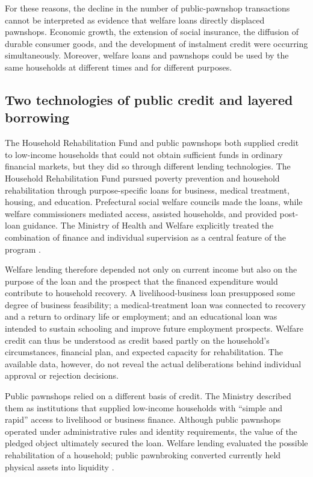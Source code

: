 \documentclass[12pt,a4paper]{article}
\begin{document}
For these reasons, the decline in the number of public-pawnshop transactions cannot be interpreted as evidence that welfare loans directly displaced pawnshops. Economic growth, the extension of social insurance, the diffusion of durable consumer goods, and the development of instalment credit were occurring simultaneously. Moreover, welfare loans and pawnshops could be used by the same households at different times and for different purposes.

\subsection{Two technologies of public credit and layered borrowing}

The Household Rehabilitation Fund and public pawnshops both supplied credit to low-income households that could not obtain sufficient funds in ordinary financial markets, but they did so through different lending technologies. The Household Rehabilitation Fund pursued poverty prevention and household rehabilitation through purpose-specific loans for business, medical treatment, housing, and education. Prefectural social welfare councils made the loans, while welfare commissioners mediated access, assisted households, and provided post-loan guidance. The Ministry of Health and Welfare explicitly treated the combination of finance and individual supervision as a central feature of the program \citep{MinistryofHealthandWelfare1964}.

Welfare lending therefore depended not only on current income but also on the purpose of the loan and the prospect that the financed expenditure would contribute to household recovery. A livelihood-business loan presupposed some degree of business feasibility; a medical-treatment loan was connected to recovery and a return to ordinary life or employment; and an educational loan was intended to sustain schooling and improve future employment prospects. Welfare credit can thus be understood as credit based partly on the household's circumstances, financial plan, and expected capacity for rehabilitation. The available data, however, do not reveal the actual deliberations behind individual approval or rejection decisions.

Public pawnshops relied on a different basis of credit. The Ministry described them as institutions that supplied low-income households with ``simple and rapid'' access to livelihood or business finance. Although public pawnshops operated under administrative rules and identity requirements, the value of the pledged object ultimately secured the loan. Welfare lending evaluated the possible rehabilitation of a household; public pawnbroking converted currently held physical assets into liquidity \citep{MinistryofHealthandWelfare1958, MinistryofHealthandWelfare1963}.
\end{document}
